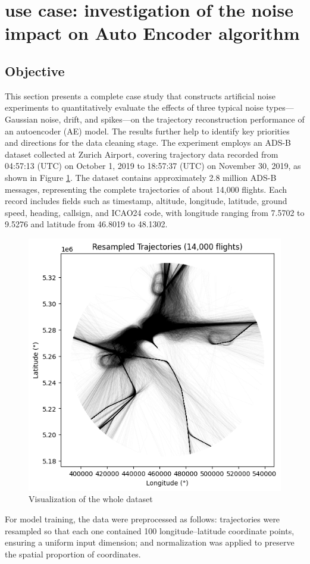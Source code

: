 \section{use case: investigation of the noise impact on Auto Encoder algorithm}

\subsection{Objective}
This section presents a complete case study that constructs artificial noise experiments to quantitatively evaluate the effects of three typical noise types—Gaussian noise, drift, and spikes—on the trajectory reconstruction performance of an autoencoder (AE) model. The results further help to identify key priorities and directions for the data cleaning stage.
The experiment employs an ADS-B dataset collected at Zurich Airport, covering trajectory data recorded from 04:57:13 (UTC) on October 1, 2019 to 18:57:37 (UTC) on November 30, 2019, as shown in Figure \ref{fig:totaltracks}. The dataset contains approximately 2.8 million ADS-B messages, representing the complete trajectories of about 14,000 flights. Each record includes fields such as timestamp, altitude, longitude, latitude, ground speed, heading, callsign, and ICAO24 code, with longitude ranging from 7.5702 to 9.5276 and latitude from 46.8019 to 48.1302.

\begin{figure}
	\centering
	\includegraphics[width=0.7\linewidth]{totaltracks}
	\caption{Visualization of the whole dataset}
	\label{fig:totaltracks}
\end{figure}

For model training, the data were preprocessed as follows: trajectories were resampled so that each one contained 100 longitude–latitude coordinate points, ensuring a uniform input dimension; and normalization was applied to preserve the spatial proportion of coordinates.
